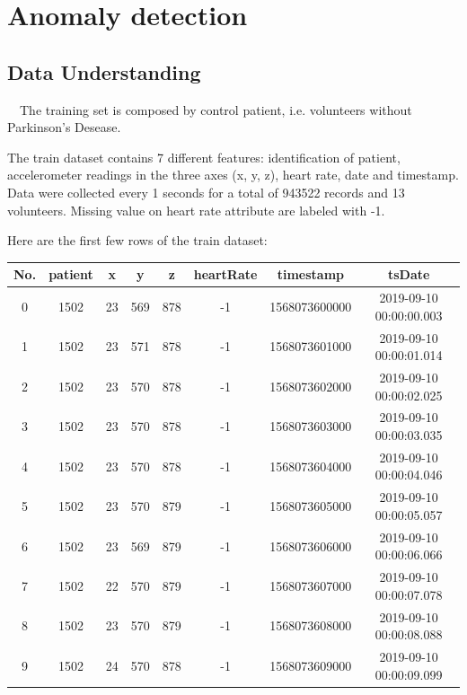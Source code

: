 \chapter*{Anomaly detection}

\section*{Data Understanding}\label{Data Understanding}

~~The training set is composed by control patient, i.e. volunteers without Parkinson’s Desease. 

The train dataset contains 7 different features: identification of patient, accelerometer readings in the three axes (x, y, z), heart rate, date and timestamp. Data were collected every 1 seconds for a total of 943522 records and 13 volunteers. Missing value on heart rate attribute are labeled with -1.

Here are the first few rows of the train dataset:

\begin{center}
\begin{tabular}{| c | c | c | c | c | c | c | c |} 
\hline
No. & patient & x & y & z & heartRate & timestamp & tsDate \\ [0.5ex] 
\hline
\hline
0 &	1502 &	23 &	569 &	878 &	-1 &	1568073600000 &	2019-09-10 00:00:00.003 \\
\hline
1 &	1502 &	23 &	571 &	878 &	-1 &	1568073601000 &	2019-09-10 00:00:01.014 \\
\hline
2 &	1502 &	23 &	570 &	878 &	-1 &	1568073602000 &	2019-09-10 00:00:02.025 \\
\hline
3 &	1502 &	23 &	570 &	878 &	-1 &	1568073603000 &	2019-09-10 00:00:03.035 \\
\hline
4 &	1502 &	23 &	570 &	878 &	-1 &	1568073604000 &	2019-09-10 00:00:04.046 \\
\hline
5 &	1502 &	23 &	570 &	879 &	-1 &	1568073605000 &	2019-09-10 00:00:05.057 \\
\hline
6 &	1502 &	23 &	569 &	879 &	-1 &	1568073606000 &	2019-09-10 00:00:06.066 \\
\hline
7 &	1502 &	22 &	570 &	879 &	-1 &	1568073607000 &	2019-09-10 00:00:07.078 \\
\hline
8 &	1502 &	23 &	570 &	879 &	-1 &	1568073608000 &	2019-09-10 00:00:08.088 \\
\hline
9 &	1502 &	24 &	570 &	878 &	-1 &	1568073609000 &	2019-09-10 00:00:09.099 \\ [1ex] 
\hline
\end{tabular}
\end{center}

